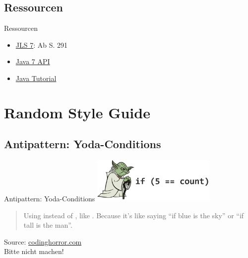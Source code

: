 \documentclass[usepdftitle=false,hyperref={pdfpagelabels=false}]{beamer}
\begin{document}
\subsection{Ressourcen}
\begin{frame}{Ressourcen}
  \begin{itemize}
    \item \href{http://docs.oracle.com/javase/specs/jls/se7/jls7.pdf}{JLS 7}: Ab S. 291
    \item \href{http://docs.oracle.com/javase/7/docs/api/java/util/Arrays.html}{Java 7 API}
    \item \href{http://docs.oracle.com/javase/tutorial/java/nutsandbolts/arrays.html}{Java Tutorial}
  \end{itemize}
\end{frame}

\section{Random Style Guide}
\subsection{Antipattern: Yoda-Conditions}
\begin{frame}{Antipattern: Yoda-Conditions}
    \includegraphics[width=60mm]{yoda-condition.png}\\
    \begin{quote}
        Using  instead of
        , like .
        Because it's like saying ``if blue is the sky'' or ``if tall
        is the man''.
    \end{quote}
    Source: \href{http://www.codinghorror.com/blog/2012/07/new-programming-jargon.html}{codinghorror.com}\\

    Bitte nicht machen!
\end{frame}
\end{document}

